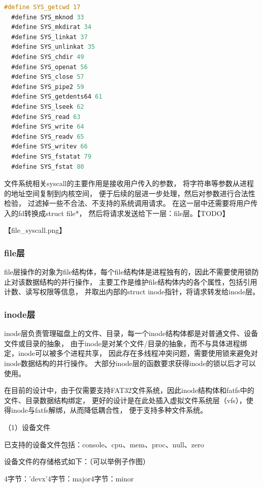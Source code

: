 \documentclass[UTF8,a4paper,10pt]{ctexart}
\begin{document}
\begin{lstlisting}[title=文件系统相关先系统调用,frame=trbl,language={C}]
  #define SYS_getcwd 17
  #define SYS_mknod 33
  #define SYS_mkdirat 34
  #define SYS_linkat 37
  #define SYS_unlinkat 35
  #define SYS_chdir 49
  #define SYS_openat 56
  #define SYS_close 57
  #define SYS_pipe2 59
  #define SYS_getdents64 61
  #define SYS_lseek 62
  #define SYS_read 63
  #define SYS_write 64
  #define SYS_readv 65
  #define SYS_writev 66
  #define SYS_fstatat 79
  #define SYS_fstat 80
  \end{lstlisting}

  文件系统相关syscall的主要作用是接收用户传入的参数，
  将字符串等参数从进程的地址空间复制到内核空间，
  便于后续的层进一步处理，然后对参数进行合法性检验，
  过滤掉一些不合法、不支持的系统调用请求。
  在这一层中还需要将用户传入的fd转换成struct file*，
  然后将请求发送给下一层：file层。【TODO】
  
  【file\_syscall.png】

\subsubsection{file层}

file层操作的对象为file结构体，每个file结构体是进程独有的，因此不需要使用锁防止对该数据结构的并行操作，
主要工作是维护file结构体内的各个属性，包括引用计数、读写权限等信息，
并取出内部的struct inode指针，将请求转发给inode层。

\subsubsection{inode层}

inode层负责管理磁盘上的文件、目录，每一个inode结构体都是对普通文件、设备文件或目录的抽象，
由于inode是对某个文件/目录的抽象，而不与具体进程绑定，inode可以被多个进程共享，
因此存在多线程冲突问题，需要使用锁来避免对inode数据结构的并行操作。
大部分inode层的函数要求获得inode的锁以后才可以使用。

在目前的设计中，由于仅需要支持FAT32文件系统，因此inode结构体和fatfs中的文件、目录数据结构绑定，
更好的设计是在此处插入虚拟文件系统层（vfs），使得inode与fatfs解绑，从而降低耦合性，
便于支持多种文件系统。

（1）设备文件

已支持的设备文件包括：console、cpu、mem、proc、null、zero

设备文件的存储格式如下：（可以举例子作图）

{4字节：'devx'}{4字节：major}{4字节：minor}
\end{document}
